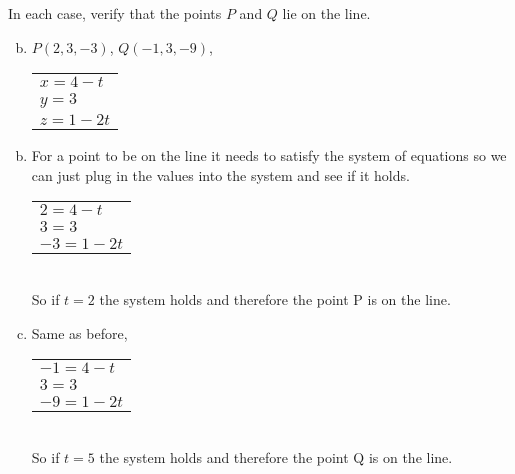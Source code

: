 \documentclass[../main.tex]{subfiles}
\begin{document}
In each case, verify that the points $P$ and $Q$ lie on the line.
\begin{enumerate}[a)]
	\setcounter{enumi}{1}
	\item $P(2, 3, -3)$, $Q(-1, 3, -9)$,
		\begin{tabular}{l}
			$x = 4 - t$ \\
		 	$y = 3$ \\
			$z = 1 - 2t$
		\end{tabular}
\end{enumerate}

\solution
\begin{enumerate}[a)]
	\setcounter{enumi}{1}
	\item For a point to be on the line it needs to satisfy the system of equations so we can just plug in the values into the system and see if it holds. \\
		\begin{tabular}{l}
				$2 = 4 - t$ \\
				$3 = 3$ \\
				$-3 = 1 - 2t$
		\end{tabular} \\
	So if $t = 2$ the system holds and therefore the point P is on the line.
	\item Same as before, \\
		\begin{tabular}{l}
			$-1 = 4 - t$ \\
		 	$3 = 3$ \\
			$-9 = 1 - 2t$
		\end{tabular} \\
		So if $t = 5$ the system holds and therefore the point Q is on the line.
\end{enumerate}
\end{document}

